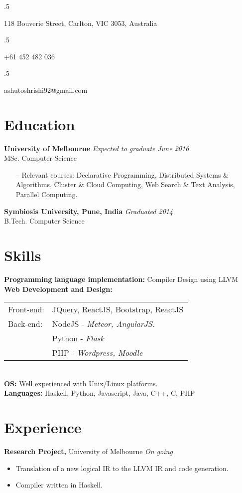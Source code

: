 \documentclass[margin]{res}
\begin{document}

\begin{resume}
  \moveleft.5\hoffset\centerline{118 Bouverie Street, Carlton, VIC 3053, Australia}
  \moveleft.5\hoffset\centerline{+61 452 482 036}
  \moveleft.5\hoffset\centerline{ashutoshrishi92@gmail.com}
  
  \section{Education}  
  \textbf{University of Melbourne} \hfill \textit{Expected to graduate June 2016} \\
  MSc. Computer Science 
  \begin{itemize} \itemsep -2pt
  \item[--] Relevant courses: Declarative Programming, Distributed Systems \&\\ 
    Algorithms, Cluster \& Cloud Computing, Web Search \& Text Analysis, \\ 
    Parallel Computing.
  \end{itemize}

  \textbf{Symbiosis University, Pune, India} \hfill \textit{Graduated 2014} \\
  B.Tech. Computer Science 

  \section{Skills}  
  \textbf{Programming language implementation:} Compiler Design using LLVM \\
  \textbf{Web Development and Design:} \\
  \begin{tabular}{l l}
    Front-end: & JQuery, ReactJS, Bootstrap, ReactJS \\
    Back-end: & NodeJS -  \textit{Meteor, AngularJS.}\\ 
              & Python -  \textit{Flask} \\
              & PHP -  \textit{Wordpress, Moodle} \\

  \end{tabular}\\
  \textbf{OS:} Well experienced with Unix/Linux platforms. \\  
  \textbf{Languages:} Haskell, Python, Javascript, Java, C++, C, PHP 

  \section{Experience}
  \textbf{Research Project,} University of Melbourne \hfill \textit{On going}
  \begin{itemize} \itemsep -2pt
  \item Translation of a new logical IR to the LLVM IR and code generation.
  \item Compiler written in Haskell.
  \end{itemize}


\end{resume}
\end{document}
